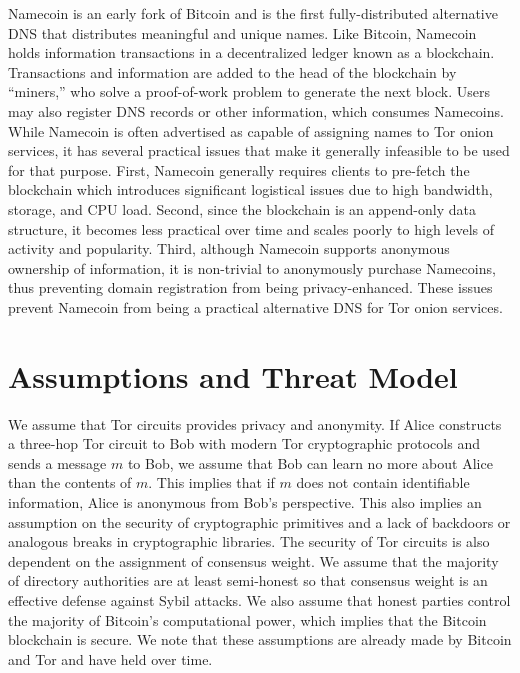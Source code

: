 \documentclass[USenglish,oneside,twocolumn]{article}
\begin{document}
Namecoin \cite{NamecoinHome} is an early fork of Bitcoin \cite{nakamoto2008bitcoin} and is the first fully-distributed alternative DNS that distributes meaningful and unique names. Like Bitcoin, Namecoin holds information transactions in a decentralized ledger known as a blockchain. Transactions and information are added to the head of the blockchain by ``miners,'' who solve a proof-of-work problem to generate the next block. Users may also register DNS records or other information, which consumes Namecoins. While Namecoin is often advertised as capable of assigning names to Tor onion services, it has several practical issues that make it generally infeasible to be used for that purpose. First, Namecoin generally requires clients to pre-fetch the blockchain which introduces significant logistical issues due to high bandwidth, storage, and CPU load. Second, since the blockchain is an append-only data structure, it becomes less practical over time and scales poorly to high levels of activity and popularity. Third, although Namecoin supports anonymous ownership of information, it is non-trivial to anonymously purchase Namecoins, thus preventing domain registration from being privacy-enhanced. These issues prevent Namecoin from being a practical alternative DNS for Tor onion services. 

\vspace{-10pt}
\section{Assumptions and Threat Model}
\label{sec:threatModel}

We assume that Tor circuits provides privacy and anonymity. If Alice constructs a three-hop Tor circuit to Bob with modern Tor cryptographic protocols and sends a message $ m $ to Bob, we assume that Bob can learn no more about Alice than the contents of $ m $. This implies that if $ m $ does not contain identifiable information, Alice is anonymous from Bob's perspective. This also implies an assumption on the security of cryptographic primitives and a lack of backdoors or analogous breaks in cryptographic libraries. The security of Tor circuits is also dependent on the assignment of consensus weight. We assume that the majority of directory authorities are at least semi-honest so that consensus weight is an effective defense against Sybil attacks. We also assume that honest parties control the majority of Bitcoin's computational power, which implies that the Bitcoin blockchain is secure. We note that these assumptions are already made by Bitcoin and Tor and have held over time.
\end{document}
